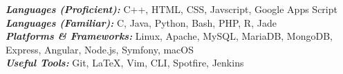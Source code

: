 

\begin{cvparagraph}
  \textbf{\textit{Languages (Proficient): }} C++, HTML, CSS, Javscript, Google Apps Script\\
  \textbf{\textit{Languages (Familiar): }}C, Java, Python, Bash, PHP, R, Jade \\
  \textbf{\textit{Platforms \& Frameworks: }}Linux, Apache, MySQL, MariaDB, MongoDB, Express, Angular, Node.js, Symfony, macOS \\
  \textbf{\textit{Useful Tools: }}Git, \LaTeX, Vim, CLI, Spotfire, Jenkins
\end{cvparagraph}
